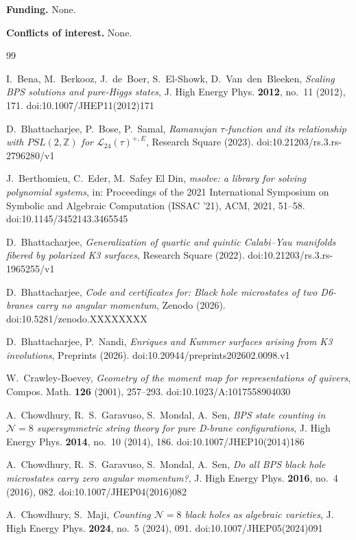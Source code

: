 \documentclass[11pt]{amsart}
\theoremstyle{definition}
\newcommand{\zenodoDOI}{10.5281/zenodo.XXXXXXXX}
\begin{document}
\smallskip\noindent\textbf{Funding.} None.

\smallskip\noindent\textbf{Conflicts of interest.} None.

\begin{thebibliography}{99}

 I.~Bena, M.~Berkooz, J.~de~Boer, S.~El-Showk, D.~Van~den~Bleeken, \emph{Scaling BPS solutions and pure-Higgs states}, J. High Energy Phys. \textbf{2012}, no.~11 (2012), 171. doi:10.1007/JHEP11(2012)171

 D.~Bhattacharjee, P.~Bose, P.~Samal, \emph{Ramanujan $\tau$-function and its relationship with $PSL(2,\mathbb Z)$ for $\mathcal L_{24}(\tau)^{+,E}$}, Research Square (2023). doi:10.21203/rs.3.rs-2796280/v1

 J.~Berthomieu, C.~Eder, M.~Safey El Din, \emph{msolve: a library for solving polynomial systems}, in: Proceedings of the 2021 International Symposium on Symbolic and Algebraic Computation (ISSAC '21), ACM, 2021, 51--58. doi:10.1145/3452143.3465545

 D.~Bhattacharjee, \emph{Generalization of quartic and quintic Calabi--Yau manifolds fibered by polarized K3 surfaces}, Research Square (2022). doi:10.21203/rs.3.rs-1965255/v1

 D.~Bhattacharjee, \emph{Code and certificates for: Black hole microstates of two D6-branes carry no angular momentum}, Zenodo (2026). doi:\zenodoDOI

 D.~Bhattacharjee, P.~Nandi, \emph{Enriques and Kummer surfaces arising from K3 involutions}, Preprints (2026). doi:10.20944/preprints202602.0098.v1

 W.~Crawley-Boevey, \emph{Geometry of the moment map for representations of quivers}, Compos. Math. \textbf{126} (2001), 257--293. doi:10.1023/A:1017558904030

 A.~Chowdhury, R.~S.~Garavuso, S.~Mondal, A.~Sen, \emph{BPS state counting in $\mathcal N=8$ supersymmetric string theory for pure D-brane configurations}, J. High Energy Phys. \textbf{2014}, no.~10 (2014), 186. doi:10.1007/JHEP10(2014)186

 A.~Chowdhury, R.~S.~Garavuso, S.~Mondal, A.~Sen, \emph{Do all BPS black hole microstates carry zero angular momentum?}, J. High Energy Phys. \textbf{2016}, no.~4 (2016), 082. doi:10.1007/JHEP04(2016)082

 A.~Chowdhury, S.~Maji, \emph{Counting $\mathcal N=8$ black holes as algebraic varieties}, J. High Energy Phys. \textbf{2024}, no.~5 (2024), 091. doi:10.1007/JHEP05(2024)091


\end{thebibliography}
\end{document}
